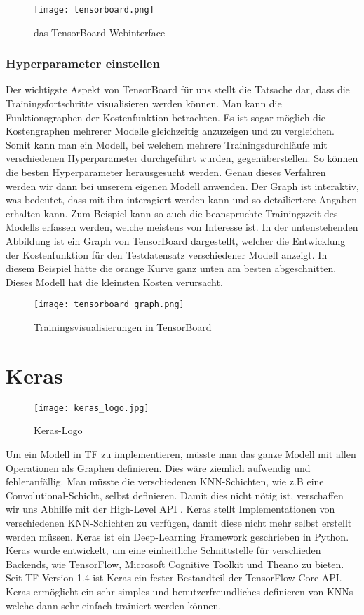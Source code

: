 \begin{figure}[h!]
  \centering
  \texttt{[image: tensorboard.png]}
  \caption{das TensorBoard-Webinterface}
\end{figure}

\subsubsection{Hyperparameter einstellen}
Der wichtigste Aspekt von TensorBoard für uns stellt die Tatsache dar, dass
die Trainingsfortschritte visualisieren werden können. Man kann die
Funktionsgraphen der Kostenfunktion betrachten. Es ist sogar möglich die
Kostengraphen mehrerer Modelle gleichzeitig anzuzeigen und zu vergleichen.
Somit kann man ein Modell, bei welchem mehrere Trainingsdurchläufe mit
verschiedenen Hyperparameter durchgeführt wurden, gegenüberstellen.
So können die besten Hyperparameter herausgesucht werden.
Genau dieses Verfahren werden wir dann bei unserem eigenen Modell anwenden.
\para{}
Der Graph ist interaktiv, was bedeutet, dass mit ihm interagiert werden kann und
so detailiertere Angaben erhalten kann. Zum Beispiel kann so auch die
beanspruchte Trainingszeit des Modells erfassen werden, welche meistens von Interesse ist.
\para{}
In der untenstehenden Abbildung ist ein Graph von TensorBoard dargestellt,
welcher die Entwicklung der Kostenfunktion für den Testdatensatz verschiedener
Modell anzeigt. In diesem Beispiel hätte die orange Kurve ganz unten am besten
abgeschnitten. Dieses Modell hat die kleinsten Kosten verursacht.

\begin{figure}[h!]
  \centering
  \texttt{[image: tensorboard\_graph.png]}
  \caption{Trainingsvisualisierungen in TensorBoard}
\end{figure}
\para{}

\section{Keras}
\begin{wrapfigure}{l}{2cm}
  \texttt{[image: keras\_logo.jpg]}
  \caption{Keras-Logo}
\end{wrapfigure}
Um ein Modell in TF zu implementieren, müsste man das ganze Modell mit
allen Operationen als Graphen definieren. Dies wäre ziemlich aufwendig und fehleranfällig.
Man müsste die verschiedenen KNN-Schichten, wie z.B eine Convolutional-Schicht, selbst definieren.
Damit dies nicht nötig ist, verschaffen wir uns Abhilfe mit der High-Level API .
Keras stellt Implementationen von verschiedenen KNN-Schichten zu verfügen, damit
diese nicht mehr selbst erstellt werden müssen.
\para{}
Keras ist ein Deep-Learning Framework geschrieben in
Python. Keras wurde entwickelt, um eine einheitliche Schnittstelle für
verschieden Backends, wie TensorFlow, Microsoft Cognitive Toolkit und Theano zu
bieten. Seit TF Version 1.4 ist Keras ein fester Bestandteil der TensorFlow-Core-API.
Keras ermöglicht ein sehr simples und benutzerfreundliches definieren von
KNNs welche dann sehr einfach trainiert werden können.

